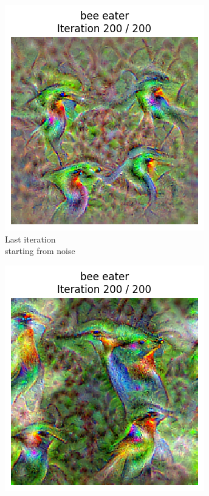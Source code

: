 \begin{figure}[H]
    \centering
    \begin{subfigure}{.33\textwidth}
        \centering
        \includegraphics[width=.7\linewidth]{SqueezeNet/SqueezeNet_bird_animated_reg++_last_frame.png}
        \caption{Last iteration\\starting from noise}
        \label{fig:class_viz_start_image:png_noise}
    \end{subfigure}%
    \begin{subfigure}{.33\textwidth}
        \centering
        \includegraphics[width=.7\linewidth]{SqueezeNet/SqueezeNet_bird_animated_same_init_img_reg++_last_frame.png}

\end{subfigure}
\end{figure}
